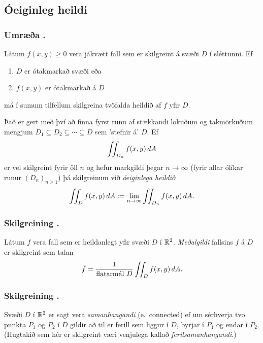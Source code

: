 \subsection{Óeiginleg heildi}
 \subsubsection{Umræða \kaflanr.}
  Látum $f(x,y)\geq 0$ vera jákvætt fall sem er skilgreint á svæði $D$ í sléttunni. Ef
  \begin {enumerate}
   \item $D$ er ótakmarkað svæði eða
   \item $f(x,y)$ er ótakmarkað á $D$
  \end {enumerate}
má í sumum tilfellum skilgreina tvöfalda heildið af $f$ yfir $D$.

\medskip
Það er gert með því að finna fyrst runu af stækkandi lokuðum og takmörkuðum mengjum $D_1 \subseteq D_2 \subseteq \cdots \subseteq D$ sem 'stefnir á' $D$. Ef
\begin {equation*}
\int\!\!\!\int_{D_n} f(x,y)\,dA
\end {equation*}
er vel skilgreint fyrir öll $n$ og hefur markgildi þegar $n\to \infty$ (fyrir allar ólíkar runur $(D_n)_{n\geq 1}$) þá 
skilgreinum við \emph{óeiginlega heildið}
\begin {equation*}
 \int\!\!\!\int_{D} f(x,y)\,dA := \lim_{n\to \infty} \int\!\!\!\int_{D_n} f(x,y)\,dA .
\end {equation*}





\subsubsection{Skilgreining \kaflanr.}
 Látum $f$ vera fall sem er heildanlegt yfir svæði $D$ í ${\mathbb R}^2$.  {\em Meðalgildi} fallsins $f$ á $D$ er skilgreint sem talan 
$$\bar{f}=\frac{1}{\mbox{flatarmál }D}\int\!\!\!\int_D f(x,y)\,dA.$$ 




\subsubsection{Skilgreining \kaflanr.}
Svæði $D$ í ${\mathbb R}^2$ er sagt vera {\em
  samanhangandi} (e.~connected) ef um sérhverja tvo punkta $P_1$ og $P_2$ í $D$
gildir að til er ferill sem liggur í $D$, byrjar í $P_1$ og endar í
$P_2$.  (Hugtakið sem hér er skilgreint væri venjulega kallað {\em
  ferilsamanhangandi}.) 



